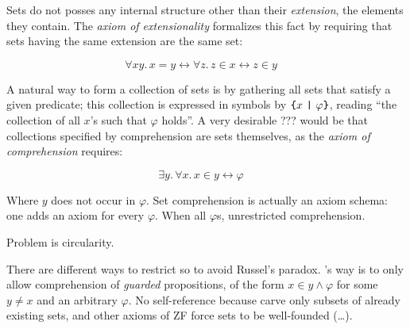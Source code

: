 \documentclass[sigplan,10pt,anonymous,review]{acmart}\settopmatter{printfolios=true,printccs=false,printacmref=false}
\begin{document}


Sets do not posses any internal structure other than their \emph{extension}, \ie{} the elements they contain. The \emph{axiom of extensionality} formalizes this fact by requiring that sets having the same extension are the same set:

\[\forall x y.\, x = y \leftrightarrow \forall z. \, z \in x \leftrightarrow z \in y \quad \tag{\SetExt} \]

A natural way to form a collection of sets is by gathering all sets that satisfy a given predicate; this collection is expressed in symbols by $\text{\texttt{\{}} x ~\text{\texttt{|}}~ \varphi \text{\texttt{\}}}$, reading ``the collection of all $x$'s such that $\varphi$ holds''.  A very desirable ??? would be that collections specified by comprehension are sets themselves, as the \emph{axiom of comprehension} requires:

\[ \exists y.\, \forall x.\, x \in y \leftrightarrow \varphi  \quad \tag{\SetCompr} \]


Where $y$ does not occur in $\varphi$. 
Set comprehension is actually an axiom schema: one adds an axiom for every $\varphi$. 
When all $\varphi$s, unrestricted comprehension. 


Problem is circularity.

There are different ways to restrict \SetCompr{} so to avoid Russel's paradox. \ZF's way is to only allow comprehension of \emph{guarded} propositions, of the form $x \in y \land \varphi$ for some $y\neq x$ and an arbitrary $\varphi$.  No self-reference because carve only subsets of already existing sets, and other axioms of ZF force sets to be well-founded (\dots).
\end{document}
